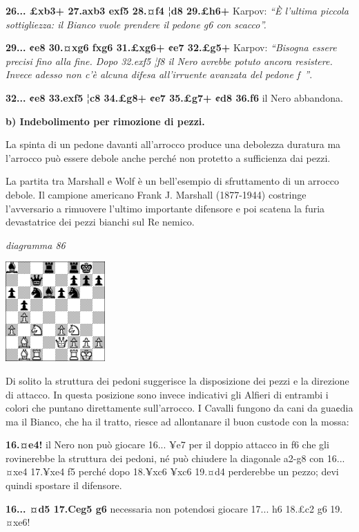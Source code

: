 \documentclass[
]{article}
\begin{document}
\textbf{26... £xb3+ 27.axb3 exf5 28.¤f4 ¦d8 29.£h6+} Karpov: \emph{``È
l'ultima piccola sottigliezza: il Bianco vuole prendere il pedone g6 con
scacco''.}

\textbf{29... ¢e8 30.¤xg6 fxg6 31.£xg6+ ¢e7 32.£g5+} Karpov:
\emph{``Bisogna essere precisi fino alla fine. Dopo 32.exf5 ¦f8 il Nero
avrebbe potuto ancora resistere. Invece adesso non c'è alcuna difesa
all'irruente avanzata del pedone f~''}.

\textbf{32... ¢e8 33.exf5 ¦c8 34.£g8+ ¢e7 35.£g7+ ¢d8 36.f6} il Nero
abbandona.

\textbf{b) Indebolimento per rimozione di pezzi.}

La spinta di un pedone davanti all'arrocco produce una debolezza
duratura ma l'arrocco può essere debole anche perché non protetto a
sufficienza dai pezzi.

La partita tra Marshall e Wolf è un bell'esempio di sfruttamento di un
arrocco debole. Il campione americano Frank J. Marshall (1877-1944)
costringe l'avversario a rimuovere l'ultimo importante difensore e poi
scatena la furia devastatrice dei pezzi bianchi sul Re nemico.

\emph{diagramma 86}

\includegraphics[width=1.5in,height=1.5in]{vertopal_109f12be458a423d8f3cc838880eaea2/media/image86.png}

Di solito la struttura dei pedoni suggerisce la disposizione dei pezzi e
la direzione di attacco. In questa posizione sono invece indicativi gli
Alfieri di entrambi i colori che puntano direttamente sull'arrocco. I
Cavalli fungono da cani da gua¢dia ma il Bianco, che ha il tratto,
riesce ad allontanare il buon custode con la mossa:

\textbf{16.¤e4!} il Nero non può giocare 16... ¥e7 per il doppio attacco
in f6 che gli rovinerebbe la struttura dei pedoni, né può chiudere la
diagonale a2-g8 con 16... ¤xe4 17.¥xe4 f5 perché dopo 18.¥xc6 ¥xc6
19.¤d4 perderebbe un pezzo; devi quindi spostare il difensore.

\textbf{16... ¤d5 17.Ceg5 g6} necessaria non potendosi giocare 17... h6
18.£c2 g6 19.¤xe6!
\end{document}
